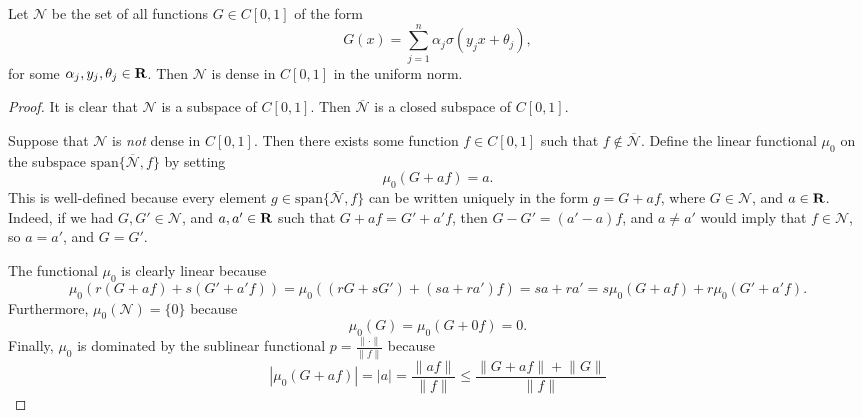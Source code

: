 \documentclass{homework}
\begin{document}
	\question
	\newcommand{\neural}{\mathcal{N}}
	Let $\neural$ be the set of all functions $G \in C[0,1]$ of the form
	\begin{equation}
		G(x) = \sum_{j=1}^n \alpha_j\sigma(y_jx + \theta_j),
	\end{equation}
	for some $\alpha_j, y_j, \theta_j \in \textbf{R}$. Then $\neural$ is dense in $C[0,1]$ in the uniform norm.
	\begin{proof}
		It is clear that $\neural$ is a subspace of $C[0,1]$. Then $\overline{\neural}$ is a closed subspace of $C[0,1]$.
		
		Suppose that $\neural$ is \textit{not} dense in $C[0,1]$. Then there exists some function $f \in C[0,1]$ such that $f \notin \overline{\neural}$. Define the linear functional $\mu_0$ on the subspace $\mathrm{span}\{\overline{\neural}, f\}$ by setting
		\begin{equation}
			\mu_0(G + af) = a.
		\end{equation}
		This is well-defined because every element $g \in \mathrm{span}\{\overline{\neural}, f\}$ can be written uniquely in the form $g = G + af$, where $G \in \neural$, and $a \in \textbf{R}$. Indeed, if we had $G,G' \in \neural$, and $a,a' \in \textbf{R}$ such that $G + af = G' + a'f$, then $G-G' = (a'-a)f$, and $a \ne a'$ would imply that $f \in \neural$, so $a = a'$, and $G = G'$.
		
		The functional $\mu_0$ is clearly linear because
		\begin{equation}
			\mu_0(r(G + af) + s(G' + a'f)) = \mu_0((rG + sG') + (sa + ra')f) = sa + ra' = s\mu_0(G+af) + r\mu_0(G'+a'f).
		\end{equation}
		Furthermore, $\mu_0(\neural) = \{0\}$ because
		\begin{equation}
			\mu_0(G) = \mu_0(G + 0f) = 0.
		\end{equation}
		Finally, $\mu_0$ is dominated by the sublinear functional $p =\frac{\lVert \cdot \rVert}{\lVert f \rVert}$ because
		\begin{equation}
			|\mu_0(G + af)| = |a| = \frac{\lVert af\rVert}{\lVert f\rVert} \le \frac{\lVert G+af\rVert + \lVert G \rVert}{\lVert f \rVert}
		\end{equation}
	\end{proof}
\end{document}
